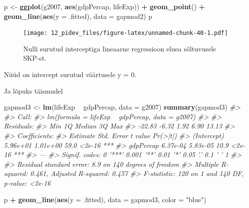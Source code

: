 \documentclass[]{book}
\newenvironment{Shaded}{\begin{snugshade}}{\end{snugshade}}
\newcommand{\KeywordTok}[1]{\textcolor[rgb]{0.13,0.29,0.53}{\textbf{#1}}}
\newcommand{\DataTypeTok}[1]{\textcolor[rgb]{0.13,0.29,0.53}{#1}}
\newcommand{\StringTok}[1]{\textcolor[rgb]{0.31,0.60,0.02}{#1}}
\newcommand{\CommentTok}[1]{\textcolor[rgb]{0.56,0.35,0.01}{\textit{#1}}}
\newcommand{\OperatorTok}[1]{\textcolor[rgb]{0.81,0.36,0.00}{\textbf{#1}}}
\newcommand{\NormalTok}[1]{#1}
\begin{document}
\begin{Shaded}
\begin{Highlighting}[]
\NormalTok{p <-}\StringTok{ }\KeywordTok{ggplot}\NormalTok{(g2007, }\KeywordTok{aes}\NormalTok{(gdpPercap, lifeExp)) }\OperatorTok{+}
\StringTok{  }\KeywordTok{geom_point}\NormalTok{() }\OperatorTok{+}\StringTok{ }
\StringTok{  }\KeywordTok{geom_line}\NormalTok{(}\KeywordTok{aes}\NormalTok{(}\DataTypeTok{y =}\NormalTok{ .fitted), }\DataTypeTok{data =}\NormalTok{ gapmod2)}
\NormalTok{p}
\end{Highlighting}
\end{Shaded}

\begin{figure}
\centering
\texttt{[image: 12\_pidev\_files/figure-latex/unnamed-chunk-40-1.pdf]}
\caption{\label{fig:unnamed-chunk-40}Nulli surutud interceptiga lineaarne
regressioon eluea sõltuvusele SKP-st.}
\end{figure}

Nüüd on intercept surutud väärtusele y = 0.

Ja lõpuks täismudel

\begin{Shaded}
\begin{Highlighting}[]
\NormalTok{gapmod3 <-}\StringTok{ }\KeywordTok{lm}\NormalTok{(lifeExp }\OperatorTok{~}\StringTok{ }\NormalTok{gdpPercap, }\DataTypeTok{data =}\NormalTok{ g2007)}
\KeywordTok{summary}\NormalTok{(gapmod3)}
\CommentTok{#> }
\CommentTok{#> Call:}
\CommentTok{#> lm(formula = lifeExp ~ gdpPercap, data = g2007)}
\CommentTok{#> }
\CommentTok{#> Residuals:}
\CommentTok{#>    Min     1Q Median     3Q    Max }
\CommentTok{#> -22.83  -6.32   1.92   6.90  13.13 }
\CommentTok{#> }
\CommentTok{#> Coefficients:}
\CommentTok{#>             Estimate Std. Error t value Pr(>|t|)    }
\CommentTok{#> (Intercept) 5.96e+01   1.01e+00    59.0   <2e-16 ***}
\CommentTok{#> gdpPercap   6.37e-04   5.83e-05    10.9   <2e-16 ***}
\CommentTok{#> ---}
\CommentTok{#> Signif. codes:  0 '***' 0.001 '**' 0.01 '*' 0.05 '.' 0.1 ' ' 1}
\CommentTok{#> }
\CommentTok{#> Residual standard error: 8.9 on 140 degrees of freedom}
\CommentTok{#> Multiple R-squared:  0.461,  Adjusted R-squared:  0.457 }
\CommentTok{#> F-statistic:  120 on 1 and 140 DF,  p-value: <2e-16}
\end{Highlighting}
\end{Shaded}

\begin{Shaded}
\begin{Highlighting}[]
\NormalTok{p }\OperatorTok{+}\StringTok{ }\KeywordTok{geom_line}\NormalTok{(}\KeywordTok{aes}\NormalTok{(}\DataTypeTok{y =}\NormalTok{ .fitted), }\DataTypeTok{data =}\NormalTok{ gapmod3, }\DataTypeTok{color =} \StringTok{"blue"}\NormalTok{)}
\end{Highlighting}
\end{Shaded}
\end{document}
